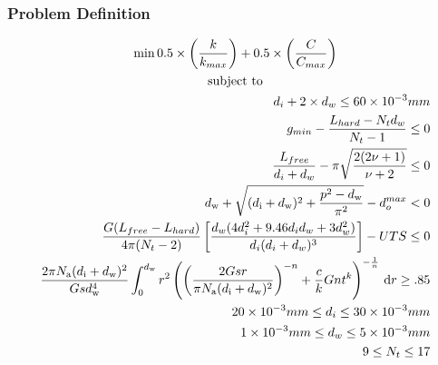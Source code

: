 \documentclass[10pt]{article}
\begin{document}
	\subsubsection{Problem Definition}
	\vspace{-.2in}
	\begin{equation}
					\begin{gathered}
	 					\min_{} 0.5 \times\left(\frac{k}{k_{max}}\right) + 0.5 \times \left( \frac{C}{C_{max}}\right) \\
	 					\mbox{subject to} \\%
						\begin{split}
							 d_{i} + 2 \times d_{w} \leq 60 \times 10^{-3} mm\\
							 g_{min} - \dfrac{L_{hard} - N_{t}d_{w}}{N_{t}-1} \leq 0\\
							 \frac{L_{free}}{d_{i} + d_{w}} - \pi \sqrt{\frac{2(2 \nu + 1)}{\nu + 2}} \leq 0\\
							 d_{\text{w}} + \sqrt{(d_{\text{i}} + d_{\text{w}})^{2} + \frac{p^{2} - d_{\text{w}}}{\pi^{2}}} - d_{o}^{max} < 0\\
							 \frac{G(L_{free} - L_{hard})}{4 \pi (N_{t} - 2) } \left[\frac{d_{w} (4d_{i}^{2} + 9.46d_{i} d_{w} + 3 d_{w}^{2})}{d_{i}(d_{i}+d_{w})^{3}}\right] - UTS \leq 0\\
							 \frac{2\pi N_{\text{a}} (d_{\text{i}}+d_{\text{w}})^2}{Gsd_{\text{w}}^4}\int_0^{d_\text{w}} r^2 \left(\left(\frac{2Gsr}{\pi N_{\text{a}} (d_{\text{i}}+d_{\text{w}})^2}\right)^{-n} + {c\over k} Gnt^k \right)^{-{1\over n}} \,\mathrm{d} r\geq .85\\
							 20 \times 10 ^{-3} mm \leq d_{i} \leq 30 \times 10^{-3} mm\\	 
							 1 \times 10^{-3} mm \leq d_{w} \leq 5 \times 10^{-3} mm\\	 
							 9 \leq N_{t} \leq 17\\	 
						\end{split}
					\end{gathered}
					\label{eq:Case_2_Problem_Definition}	
				\end{equation}
	
\end{document}
